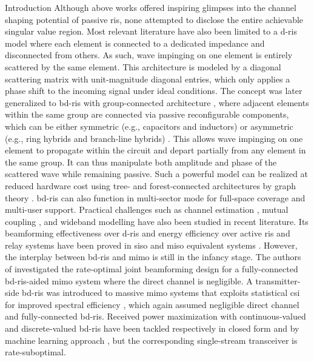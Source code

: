 \documentclass[journal]{IEEEtran}
\begin{document}
\begin{section}{Introduction}
		Although above works offered inspiring glimpses into the channel shaping potential of passive \gls{ris}, none attempted to disclose the entire achievable singular value region.
		Most relevant literature \cite{ElMossallamy2021,Meng2023,Huang2023,Chae2023,Wu2019,Santamaria2023a} have also been limited to a \gls{d}-\gls{ris} model where each element is connected to a dedicated impedance and disconnected from others.
		As such, wave impinging on one element is entirely scattered by the same element.
		This architecture is modeled by a diagonal scattering matrix with unit-magnitude diagonal entries, which only applies a phase shift to the incoming signal under ideal conditions.
		The concept was later generalized to \gls{bd}-\gls{ris} with group-connected architecture \cite{Shen2020a}, where adjacent elements within the same group are connected via passive reconfigurable components, which can be either symmetric (e.g., capacitors and inductors) or asymmetric (e.g., ring hybrids and branch-line hybrids) \cite{Ahn2006}.
		This allows wave impinging on one element to propagate within the circuit and depart partially from any element in the same group.
		It can thus manipulate both amplitude and phase of the scattered wave while remaining passive.
		Such a powerful model can be realized at reduced hardware cost using tree- and forest-connected architectures by graph theory \cite{Nerini2024}.
		\gls{bd}-\gls{ris} can also function in
		multi-sector mode \cite{Li2023c} for full-space coverage and multi-user support.
		Practical challenges such as channel estimation \cite{Li2024}, mutual coupling \cite{Li2023f}, and wideband modelling \cite{Li2024a} have also been studied in recent literature.
		Its beamforming effectiveness over \gls{d}-\gls{ris} and energy efficiency over active \gls{ris} and relay systems have been proved in \gls{siso} and \gls{miso} equivalent systems \cite{Shen2020a,Nerini2024,Santamaria2023,Fang2023,Zhou2023,Li2023c}.
		However, the interplay between \gls{bd}-\gls{ris} and \gls{mimo} is still in the infancy stage.
		The authors of \cite{Bartoli2023} investigated the rate-optimal joint beamforming design for a fully-connected \gls{bd}-\gls{ris}-aided \gls{mimo} system where the direct channel is negligible.
		A transmitter-side \gls{bd}-\gls{ris} was introduced to
		massive \gls{mimo} systems that exploits statistical \gls{csi} for improved spectral efficiency \cite{Mishra2024}, which again assumed negligible direct channel and fully-connected \gls{bd}-\gls{ris}.
		Received power maximization with continuous-valued and discrete-valued \gls{bd}-\gls{ris} have been tackled respectively in closed form \cite{Nerini2023} and by machine learning approach \cite{Nerini2023b}, but the corresponding single-stream transceiver is rate-suboptimal.


\end{section}
\end{document}
